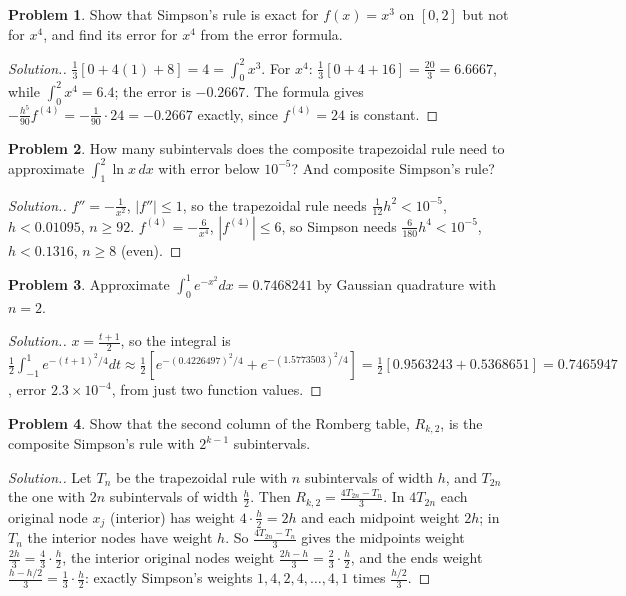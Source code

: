 \documentclass[11pt,a4paper]{article}
\numberwithin{equation}{section}
\theoremstyle{definition}
\newtheorem{problemx}{Problem}[subsection]
\newenvironment{problem}{\begin{problemx}}{\end{problemx}}
\newenvironment{solution}
  {\renewcommand{\qedsymbol}{}\begin{proof}[\textit{Solution}.]}
  {\end{proof}}
\begin{document}
\begin{problem}
Show that Simpson's rule is exact for $f(x) = x^3$ on $[0,2]$ but not for $x^4$, and find its error for $x^4$ from the error formula.
\end{problem}
\begin{solution}
$\frac13[0+4(1)+8] = 4 = \int_0^2x^3$. For $x^4$: $\frac13[0+4+16] = \frac{20}{3} = 6.6667$, while $\int_0^2x^4 = 6.4$; the error is $-0.2667$. The formula gives
$-\frac{h^5}{90}f^{(4)} = -\frac{1}{90}\cdot24 = -0.2667$ exactly, since $f^{(4)} = 24$ is constant.
\end{solution}

\begin{problem}
How many subintervals does the composite trapezoidal rule need to approximate $\int_1^2\ln x\,dx$ with error below $10^{-5}$? And composite
Simpson's rule?
\end{problem}
\begin{solution}
$f'' = -\frac{1}{x^2}$, $|f''|\leq1$, so the trapezoidal rule needs $\frac{1}{12}h^2<10^{-5}$, $h<0.01095$, $n\geq92$. $f^{(4)} = -\frac{6}{x^4}$, $|f^{(4)}|\leq6$, so
Simpson needs $\frac{6}{180}h^4<10^{-5}$, $h<0.1316$, $n\geq8$ (even).
\end{solution}

\begin{problem}
Approximate $\int_0^1e^{-x^2}dx = 0.7468241$ by Gaussian quadrature with $n = 2$.
\end{problem}
\begin{solution}
$x = \frac{t+1}{2}$, so the integral is $\frac12\int_{-1}^1e^{-(t+1)^2/4}dt\approx\frac12\left[e^{-(0.4226497)^2/4}+e^{-(1.5773503)^2/4}\right] = \frac12[0.9563243+0.5368651] = 0.7465947$,
error $2.3\times10^{-4}$, from just two function values.
\end{solution}

\begin{problem}
Show that the second column of the Romberg table, $R_{k,2}$, is the composite Simpson's rule with $2^{k-1}$ subintervals.
\end{problem}
\begin{solution}
Let $T_n$ be the trapezoidal rule with $n$ subintervals of width $h$, and $T_{2n}$ the one with $2n$ subintervals of width $\frac h2$. Then
$R_{k,2} = \frac{4T_{2n}-T_n}{3}$. In $4T_{2n}$ each original node $x_j$ (interior) has weight $4\cdot\frac h2 = 2h$ and each midpoint weight $2h$; in $T_n$ the
interior nodes have weight $h$. So $\frac{4T_{2n}-T_n}{3}$ gives the midpoints weight $\frac{2h}{3} = \frac{4}{3}\cdot\frac h2$, the interior original nodes weight
$\frac{2h-h}{3} = \frac23\cdot\frac h2$, and the ends weight $\frac{h-h/2}{3} = \frac13\cdot\frac h2$: exactly Simpson's weights $1,4,2,4,\dots,4,1$ times $\frac{h/2}{3}$.
\end{solution}
\end{document}
